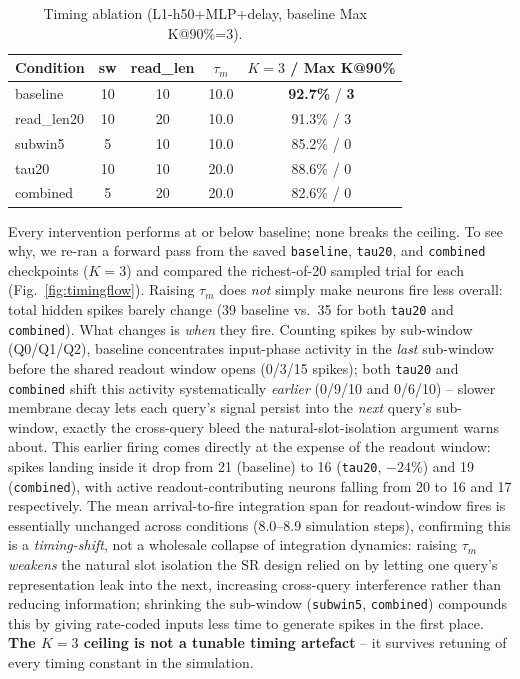 \documentclass[conference]{IEEEtran}
\begin{document}
\begin{table}[t]
\centering
\caption{Timing ablation (L1-h50+MLP+delay, baseline Max K@90\%=3).}
\label{tab:timing}
\begin{tabular}{lcccc}
\toprule
Condition & sw & read\_len & $\tau_m$ & $K{=}3$ / Max K@90\% \\
\midrule
baseline & 10 & 10 & 10.0 & \textbf{92.7\%} / \textbf{3} \\
read\_len20 & 10 & 20 & 10.0 & 91.3\% / 3 \\
subwin5 & 5 & 10 & 10.0 & 85.2\% / 0 \\
tau20 & 10 & 10 & 20.0 & 88.6\% / 0 \\
combined & 5 & 20 & 20.0 & 82.6\% / 0 \\
\bottomrule
\end{tabular}
\end{table}

Every intervention performs at or below baseline; none breaks the ceiling. To see why, we
re-ran a forward pass from the saved \texttt{baseline}, \texttt{tau20}, and
\texttt{combined} checkpoints ($K{=}3$) and compared the richest-of-20 sampled trial for
each (Fig.~\ref{fig:timingflow}). Raising $\tau_m$ does \emph{not} simply make neurons
fire less overall: total hidden spikes barely change (39 baseline vs.\ 35 for both
\texttt{tau20} and \texttt{combined}). What changes is \emph{when} they fire. Counting
spikes by sub-window (Q0/Q1/Q2), baseline concentrates input-phase activity in the
\emph{last} sub-window before the shared readout window opens (0/3/15 spikes); both
\texttt{tau20} and \texttt{combined} shift this activity systematically \emph{earlier}
(0/9/10 and 0/6/10) -- slower membrane decay lets each query's signal persist into the
\emph{next} query's sub-window, exactly the cross-query bleed the natural-slot-isolation
argument warns about. This earlier firing comes directly at the expense of the readout
window: spikes landing inside it drop from 21 (baseline) to 16 (\texttt{tau20}, $-24\%$)
and 19 (\texttt{combined}), with active readout-contributing neurons falling from 20 to
16 and 17 respectively. The mean arrival-to-fire integration span for readout-window
fires is essentially unchanged across conditions (8.0--8.9 simulation steps), confirming
this is a \emph{timing-shift}, not a wholesale collapse of integration dynamics: raising
$\tau_m$ \emph{weakens} the natural slot isolation the SR design relied
on by letting one query's representation leak into the next, increasing cross-query
interference rather than reducing information; shrinking the sub-window (\texttt{subwin5},
\texttt{combined}) compounds this by giving rate-coded inputs less time to generate
spikes in the first place. \textbf{The $K{=}3$ ceiling is not a tunable timing artefact}
-- it survives retuning of every timing constant in the simulation.
\end{document}
